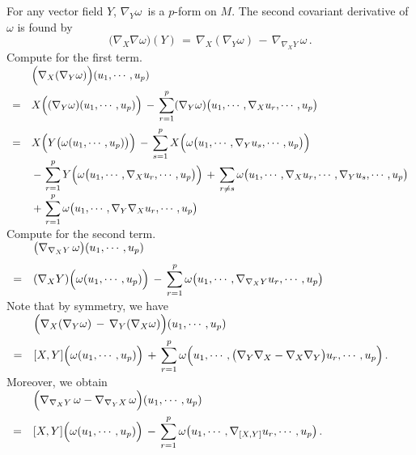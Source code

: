 \documentclass{article}[12pt,a4paper]
\begin{document}
\newpage
For any vector field $Y$, $\nabla_Y \omega$\,  is a $p$-form on $M$. 
The second covariant derivative of $\omega$ is found by
$$ \big(\nabla_X \nabla \omega\big)(Y) \,=\, \nabla_X (\nabla_Y \omega) \,-\, \nabla_{\nabla_X Y}\,\omega\,. $$
Compute for the first term. \\[0.1in]
$\begin{array}{rl}
& \Big(\nabla_X (\nabla_Y \omega)\Big)(u_1, \cdots, u_p) \\[0.1in]
=& \displaystyle
	X\Big((\nabla_Y \omega)(u_1, \cdots, u_p)\Big) 
	\,-\, \sum_{r=1}^p (\nabla_Y \omega)\big(u_1, \cdots, \nabla_X u_r, \cdots, u_p\big) \\[0.2in]
=&\displaystyle 
	X\Big(Y\big(\omega(u_1, \cdots, u_p)\big)\Big)
	\,-\, \sum_{s=1}^p X\Big(\omega\big(u_1, \cdots, \nabla_Y u_s, \cdots, u_p \big)\Big) \\[0.1in]
&\displaystyle 
	\,-\, \sum_{r=1}^p Y\Big(\omega\big(u_1, \cdots, \nabla_X u_r, \cdots, u_p\big)\Big) 
	\,+\, \sum_{r\neq s} \omega\big(u_1, \cdots, \nabla_X u_r, \cdots, \nabla_Y u_s, \cdots, u_p\big) \\[0.1in]
&\displaystyle 
	\,+\, \sum_{r=1}^p \omega\big(u_1, \cdots, \nabla_Y \nabla_X u_r, \cdots, u_p\big) 
\end{array}$ \\[0.1in]

Compute for the second term.\\[0.1in]
$\begin{array}{rl}
& \big(\nabla_{\nabla_X Y}\,\omega\big)(u_1, \cdots, u_p) \\[0.1in]
=& \displaystyle 
	(\nabla_X Y)\Big(\omega(u_1, \cdots, u_p)\Big) \,-\, \sum_{r=1}^p \omega\big(u_1, \cdots, \nabla_{\nabla_X Y}u_r, \cdots, u_p\big)
\end{array}$ \\[0.1in]

Note that by symmetry, we have \\[0.1in]
$\begin{array}{rl}
&\displaystyle \Big(\nabla_X (\nabla_Y \omega)\,-\, \nabla_Y(\nabla_X \omega)\Big)(u_1, \cdots, u_p) \\[0.1in]
=& \displaystyle 
	[X, Y]\Big(\omega(u_1, \cdots, u_p)\Big)
	\,+\, \sum_{r=1}^p \omega\Big(u_1, \cdots, \big(\nabla_Y \nabla_X - \nabla_X \nabla_Y\big)u_r, \cdots, u_p\Big) \,.
\end{array}$ \\[0.1in]

Moreover, we obtain\\[0.1in]
$ \begin{array}{rl}
&\displaystyle \Big(\nabla_{\nabla_X Y}\,\omega - \nabla_{\nabla_Y X}\,\omega \Big)(u_1, \cdots, u_p) \\[0.1in]
=& \displaystyle 
	[X, Y]\Big(\omega(u_1, \cdots, u_p)\Big) 
	\,-\,  \sum_{r=1}^p \omega\big(u_1, \cdots, \nabla_{[X,Y]}u_r, \cdots, u_p\big)\,.
\end{array}$ \\[0.1in]
\end{document}
